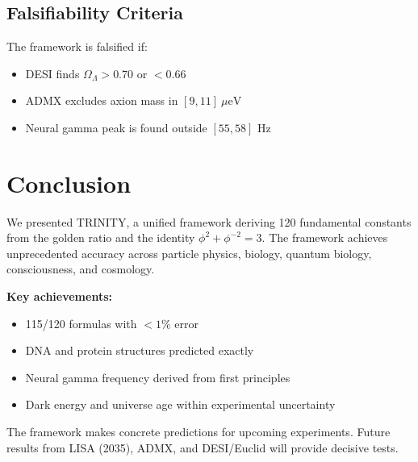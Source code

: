 \documentclass[12pt,a4paper]{article}
\begin{document}
\subsection{Falsifiability Criteria}

The framework is falsified if:
\begin{itemize}
    \item DESI finds $\Omega_\Lambda > 0.70$ or $< 0.66$
    \item ADMX excludes axion mass in $[9, 11]~\mu\text{eV}$
    \item Neural gamma peak is found outside $[55, 58]$ Hz
\end{itemize}

\section{Conclusion}

We presented TRINITY, a unified framework deriving 120 fundamental constants
from the golden ratio and the identity $\phi^2 + \phi^{-2} = 3$. The framework
achieves unprecedented accuracy across particle physics, biology, quantum
biology, consciousness, and cosmology.

\textbf{Key achievements:}
\begin{itemize}
    \item 115/120 formulas with $<1\%$ error
    \item DNA and protein structures predicted exactly
    \item Neural gamma frequency derived from first principles
    \item Dark energy and universe age within experimental uncertainty
\end{itemize}

The framework makes concrete predictions for upcoming experiments. Future
results from LISA (2035), ADMX, and DESI/Euclid will provide decisive tests.
\end{document}
